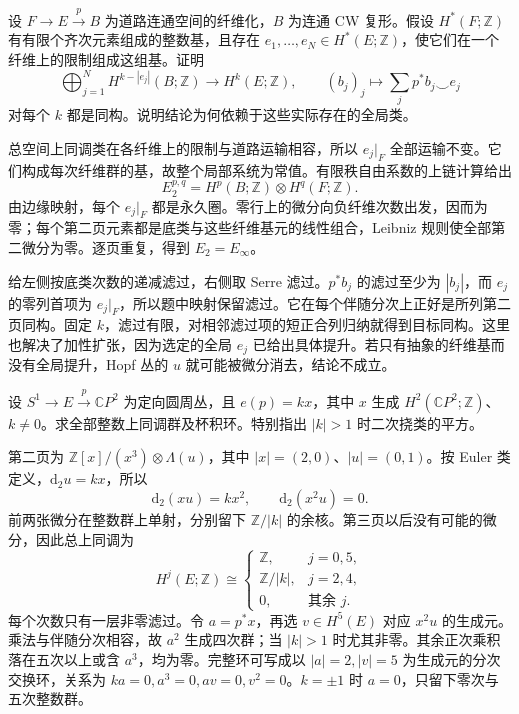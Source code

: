\begin{exercise}\label{g2:ex:serre-global-fiber-basis}
	设 \(F\to E\xrightarrow{p}B\) 为道路连通空间的纤维化，\(B\) 为连通 CW 复形。假设 \(H^*(F;\mathbb Z)\) 有有限个齐次元素组成的整数基，且存在 \(e_1,\ldots,e_N\in H^*(E;\mathbb Z)\)，使它们在一个纤维上的限制组成这组基。证明
	\[
		\bigoplus_{j=1}^NH^{k-|e_j|}(B;\mathbb Z)\longrightarrow H^k(E;\mathbb Z),\qquad
		(b_j)_j\longmapsto\sum_jp^*b_j\smile e_j
	\]
	对每个 \(k\) 都是同构。说明结论为何依赖于这些实际存在的全局类。
\end{exercise}
\begin{solution}
	总空间上同调类在各纤维上的限制与道路运输相容，所以 \(e_j|_F\) 全部运输不变。它们构成每次纤维群的基，故整个局部系统为常值。有限秩自由系数的上链计算给出
	\[
		E_2^{p,q}=H^p(B;\mathbb Z)\otimes H^q(F;\mathbb Z).
	\]
	由边缘映射，每个 \(e_j|_F\) 都是永久圈。零行上的微分向负纤维次数出发，因而为零；每个第二页元素都是底类与这些纤维基元的线性组合，Leibniz 规则使全部第二微分为零。逐页重复，得到 \(E_2=E_\infty\)。

	给左侧按底类次数的递减滤过，右侧取 Serre 滤过。\(p^*b_j\) 的滤过至少为 \(|b_j|\)，而 \(e_j\) 的零列首项为 \(e_j|_F\)，所以题中映射保留滤过。它在每个伴随分次上正好是所列第二页同构。固定 \(k\)，滤过有限，对相邻滤过项的短正合列归纳就得到目标同构。这里也解决了加性扩张，因为选定的全局 \(e_j\) 已给出具体提升。若只有抽象的纤维基而没有全局提升，Hopf 丛的 \(u\) 就可能被微分消去，结论不成立。
\end{solution}

\begin{exercise}\label{g2:ex:circle-bundle-projective-plane-ring}
	设 \(S^1\to E\xrightarrow{p}\mathbb CP^2\) 为定向圆周丛，且 \(e(p)=k x\)，其中 \(x\) 生成 \(H^2(\mathbb CP^2;\mathbb Z)\)、\(k\ne0\)。求全部整数上同调群及杯积环。特别指出 \(|k|>1\) 时二次挠类的平方。
\end{exercise}
\begin{solution}
	第二页为 \(\mathbb Z[x]/(x^3)\otimes\Lambda(u)\)，其中 \(|x|=(2,0)\)、\(|u|=(0,1)\)。按 Euler 类定义，\(\mathrm d_2u=kx\)，所以
	\[
		\mathrm d_2(xu)=kx^2,\qquad \mathrm d_2(x^2u)=0.
	\]
	前两张微分在整数群上单射，分别留下 \(\mathbb Z/|k|\) 的余核。第三页以后没有可能的微分，因此总上同调为
	\[
		H^j(E;\mathbb Z)\cong
		\begin{cases}
			\mathbb Z,&j=0,5,\\
			\mathbb Z/|k|,&j=2,4,\\
			0,&\text{其余 }j.
		\end{cases}
	\]
	每个次数只有一层非零滤过。令 \(a=p^*x\)，再选 \(v\in H^5(E)\) 对应 \(x^2u\) 的生成元。乘法与伴随分次相容，故 \(a^2\) 生成四次群；当 \(|k|>1\) 时尤其非零。其余正次乘积落在五次以上或含 \(a^3\)，均为零。完整环可写成以 \(|a|=2,|v|=5\) 为生成元的分次交换环，关系为 \(ka=0,a^3=0,av=0,v^2=0\)。\(k=\pm1\) 时 \(a=0\)，只留下零次与五次整数群。
\end{solution}

